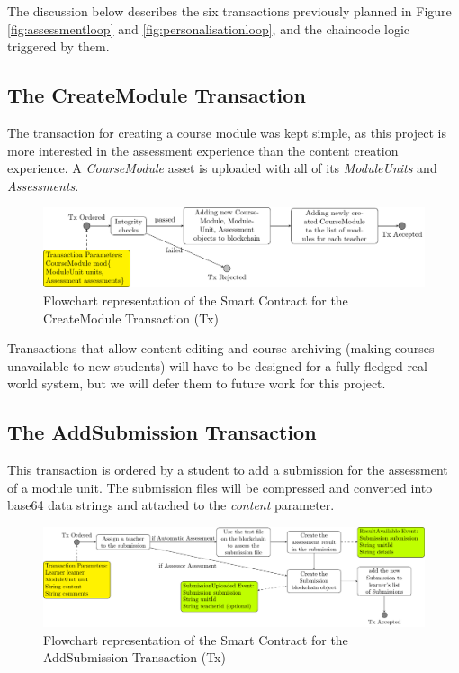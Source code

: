 The discussion below describes the six transactions previously planned in Figure \ref{fig:assessmentloop} and \ref{fig:personalisationloop},
and the chaincode logic triggered by them.

\subsection{The CreateModule Transaction}

The transaction for creating a course module was kept simple, as this project is more interested in the assessment experience than the
content creation experience. A \textit{CourseModule} asset is uploaded with all of its \textit{ModuleUnits} and \textit{Assessments}.

\begin{figure}[!ht]
	\centering
	\includegraphics[width=1.0\textwidth]{cmtx}
	\caption[CreateModule Transaction flowchart]
	{Flowchart representation of the Smart Contract for the CreateModule Transaction (Tx)} \label{fig:cmtx}
\end{figure}

Transactions that allow content editing and course archiving (making courses unavailable to new students) will have to be designed
for a fully-fledged real world system, but we will defer them to future work for this project.

\subsection{The AddSubmission Transaction}

This transaction is ordered by a student to add a submission for the assessment of a module unit. The submission files will be
compressed and converted into base64 data strings and attached to the \textit{content} parameter.

\begin{figure}[!ht]
	\centering
	\includegraphics[width=1.0\textwidth]{astx}
	\caption[AddSubmission Transaction flowchart]
	{Flowchart representation of the Smart Contract for the AddSubmission Transaction (Tx)} \label{fig:astx}
\end{figure}

